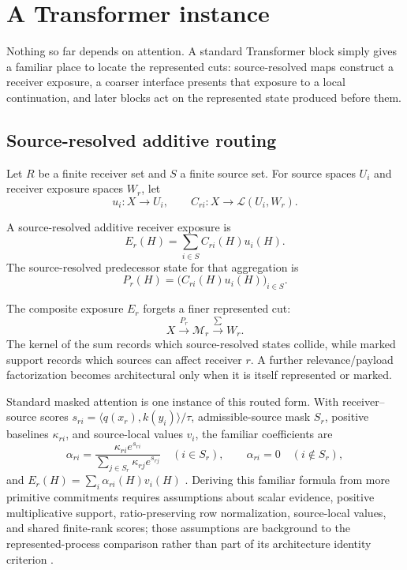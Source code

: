 \section{A Transformer instance}\label{sec:transformer-realization}

Nothing so far depends on attention. A standard Transformer block simply gives a familiar place to locate the represented cuts: source-resolved maps construct a receiver exposure, a coarser interface presents that exposure to a local continuation, and later blocks act on the represented state produced before them.

\subsection{Source-resolved additive routing}

Let $R$ be a finite receiver set and $S$ a finite source set. For source spaces $U_i$ and receiver exposure spaces $W_r$, let
\[
u_i:X\to U_i,
\qquad
C_{ri}:X\to\mathcal L(U_i,W_r).
\]

\begin{definition}\label{def:additive-routing-v13}
A source-resolved additive receiver exposure is
\[
\boxed{E_r(H)=\sum_{i\in S}C_{ri}(H)u_i(H).}
\]
The source-resolved predecessor state for that aggregation is
\[
P_r(H)=\bigl(C_{ri}(H)u_i(H)\bigr)_{i\in S}.
\]
\end{definition}

The composite exposure $E_r$ forgets a finer represented cut:
\[
X\xrightarrow{P_r}\mathcal M_r\xrightarrow{\sum}W_r.
\]
The kernel of the sum records which source-resolved states collide, while marked support records which sources can affect receiver $r$. A further relevance/payload factorization becomes architectural only when it is itself represented or marked.

Standard masked attention is one instance of this routed form. With receiver--source scores $s_{ri}=\langle q(x_r),k(y_i)\rangle/\tau$, admissible-source mask $S_r$, positive baselines $\kappa_{ri}$, and source-local values $v_i$, the familiar coefficients are
\[
\alpha_{ri}
=
\frac{\kappa_{ri}e^{s_{ri}}}{\sum_{j\in S_r}\kappa_{rj}e^{s_{rj}}}
\quad(i\in S_r),
\qquad
\alpha_{ri}=0\quad(i\notin S_r),
\]
and $E_r(H)=\sum_i\alpha_{ri}(H)v_i(H)$ \citep{vaswani2017attention}. Deriving this familiar formula from more primitive commitments requires assumptions about scalar evidence, positive multiplicative support, ratio-preserving row normalization, source-local values, and shared finite-rank scores; those assumptions are background to the represented-process comparison rather than part of its architecture identity criterion \citep{luce1959individual}.

